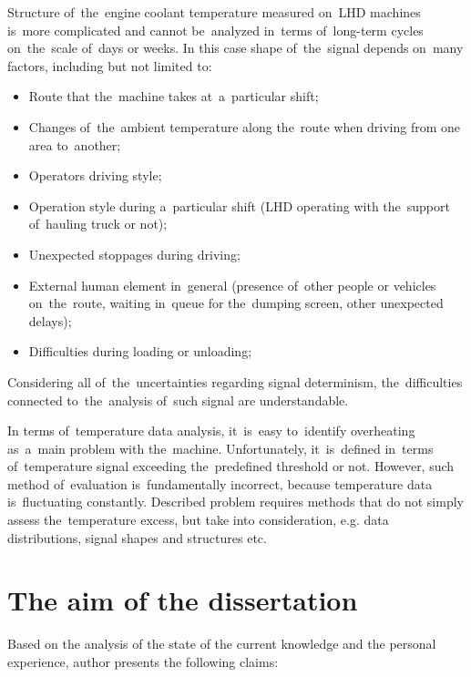 Structure of~the~engine coolant temperature measured on~LHD machines is~more complicated and cannot be~analyzed in~terms of~long-term cycles on~the~scale of~days or weeks. In this case shape of~the~signal depends on~many factors, including but not limited to:

\begin{itemize}
	\item Route that the~machine takes at~a~particular shift;
	\item Changes of~the~ambient temperature along the~route when driving from one area to~another;
	\item Operators driving style;
	\item Operation style during a~particular shift (LHD operating with the~support of~hauling truck or not);
	\item Unexpected stoppages during driving;
	\item External human element in~general (presence of~other people or vehicles on~the~route, waiting in~queue for the~dumping screen, other unexpected delays);
	\item Difficulties during loading or unloading;
\end{itemize}

Considering all of~the~uncertainties regarding signal determinism, the~difficulties connected to~the~analysis of~such signal are understandable.

In terms of~temperature data analysis, it~is~easy to~identify overheating as~a~main problem with the~machine. Unfortunately, it~is~defined in~terms of~temperature signal exceeding the~predefined threshold or not. However, such method of~evaluation is~fundamentally incorrect, because temperature data is~fluctuating constantly. Described problem requires methods that do not simply assess the~temperature excess, but take into consideration, e.g. data distributions, signal shapes and structures etc.

\section{The aim of the dissertation}

Based on the analysis of the state of the current knowledge and the personal experience, author presents the following claims:

